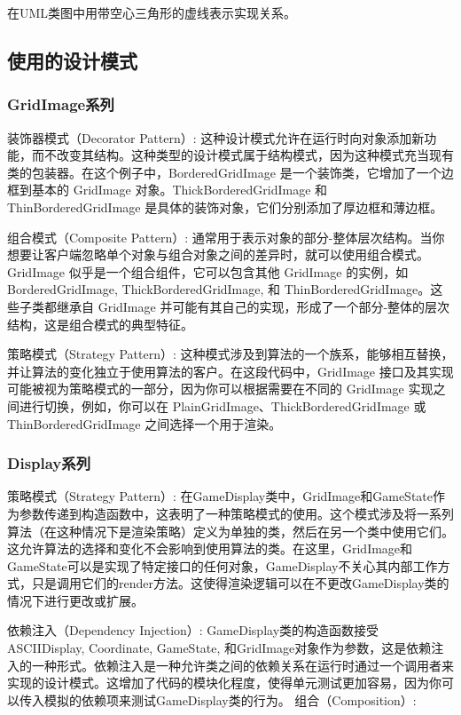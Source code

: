 在UML类图中用带空心三角形的虚线表示实现关系。

\subsection{使用的设计模式}

\subsubsection{GridImage系列}

装饰器模式（Decorator Pattern）: 这种设计模式允许在运行时向对象添加新功能，而不改变其结构。这种类型的设计模式属于结构模式，因为这种模式充当现有类的包装器。在这个例子中，BorderedGridImage 是一个装饰类，它增加了一个边框到基本的 GridImage 对象。ThickBorderedGridImage 和 ThinBorderedGridImage 是具体的装饰对象，它们分别添加了厚边框和薄边框。

组合模式（Composite Pattern）: 通常用于表示对象的部分-整体层次结构。当你想要让客户端忽略单个对象与组合对象之间的差异时，就可以使用组合模式。GridImage 似乎是一个组合组件，它可以包含其他 GridImage 的实例，如 BorderedGridImage, ThickBorderedGridImage, 和 ThinBorderedGridImage。这些子类都继承自 GridImage 并可能有其自己的实现，形成了一个部分-整体的层次结构，这是组合模式的典型特征。

策略模式（Strategy Pattern）: 这种模式涉及到算法的一个族系，能够相互替换，并让算法的变化独立于使用算法的客户。在这段代码中，GridImage 接口及其实现可能被视为策略模式的一部分，因为你可以根据需要在不同的 GridImage 实现之间进行切换，例如，你可以在 PlainGridImage、ThickBorderedGridImage 或 ThinBorderedGridImage 之间选择一个用于渲染。

\subsubsection{Display系列}

策略模式（Strategy Pattern）:
在GameDisplay类中，GridImage和GameState作为参数传递到构造函数中，这表明了一种策略模式的使用。这个模式涉及将一系列算法（在这种情况下是渲染策略）定义为单独的类，然后在另一个类中使用它们。这允许算法的选择和变化不会影响到使用算法的类。在这里，GridImage和GameState可以是实现了特定接口的任何对象，GameDisplay不关心其内部工作方式，只是调用它们的render方法。这使得渲染逻辑可以在不更改GameDisplay类的情况下进行更改或扩展。

依赖注入（Dependency Injection）:
GameDisplay类的构造函数接受ASCIIDisplay, Coordinate, GameState, 和GridImage对象作为参数，这是依赖注入的一种形式。依赖注入是一种允许类之间的依赖关系在运行时通过一个调用者来实现的设计模式。这增加了代码的模块化程度，使得单元测试更加容易，因为你可以传入模拟的依赖项来测试GameDisplay类的行为。
组合（Composition）:

